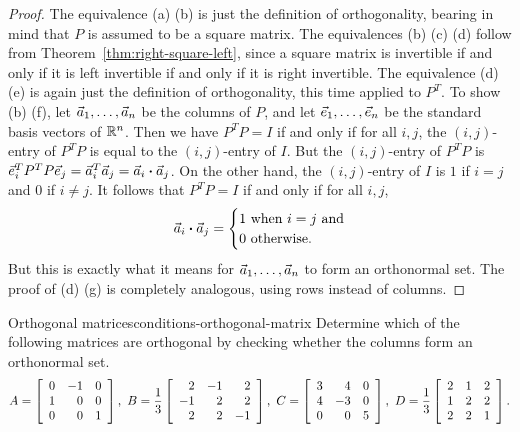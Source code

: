 \documentclass{ximera}
\begin{document}
\begin{proof}
  The equivalence (a) {\textiff} (b) is just the definition of
  orthogonality, bearing in mind that $P$ is assumed to be a square
  matrix. The equivalences (b) {\textiff} (c) {\textiff} (d) follow
  from Theorem~\ref{thm:right-square-left}, since a square matrix is
  invertible if and only if it is left invertible if and only if it is
  right invertible.  The equivalence (d) {\textiff} (e) is again just
  the definition of orthogonality, this time applied to $P^T$. To show
  (b) {\textiff} (f), let $\vect{a}_1,\ldots,\vect{a}_n$ be the
  columns of $P$, and let $\vect{e}_1,\ldots,\vect{e}_n$ be the
  standard basis vectors of $\R^n$. Then we have $P^TP = I$ if and
  only if for all $i,j$, the $(i,j)$-entry of $P^TP$ is equal to the
  $(i,j)$-entry of $I$.  But the $(i,j)$-entry of $P^TP$ is
  $\vect{e}_i^TP^TP\vect{e}_j = \vect{a}_i^T\vect{a}_j =
  \vect{a}_i\dotprod\vect{a}_j$. On the other hand, the $(i,j)$-entry
  of $I$ is $1$ if $i=j$ and $0$ if $i\neq j$. It follows that
  $P^TP=I$ if and only if for all $i,j$,
  \begin{equation*}
    \vect{a}_i\dotprod\vect{a}_j=\begin{cases}
      1 & \mbox{when $i=j$ and} \\
      0 & \mbox{otherwise}.
    \end{cases}
  \end{equation*}
  But this is exactly what it means for $\vect{a}_1,\ldots,\vect{a}_n$
  to form an orthonormal set.
  The proof of (d) {\textiff} (g) is completely analogous, using rows
  instead of columns.
\end{proof}

\begin{example}{Orthogonal matrices}{conditions-orthogonal-matrix}
  Determine which of the following matrices are orthogonal by checking
  whether the columns form an orthonormal set.
  \begin{equation*}
    A = \startmat{rrr}
      0 & -1 & 0 \\
      1 & 0 & 0 \\
      0 & 0 & 1 \\
    \stopmat,
    \quad
    B = \frac{1}{3}
    \startmat{rrr}
      2  & -1 &  2 \\
      -1 &  2 &  2 \\
      2  &  2 & -1 \\
    \stopmat,
    \quad
    C =
    \startmat{rrr}
      3 &  4 & 0 \\
      4 & -3 & 0 \\
      0 &  0 & 5 \\
    \stopmat,
    \quad
    D = \frac{1}{3}
    \startmat{rrr}
      2  &  1 &  2 \\
      1  &  2 &  2 \\
      2  &  2 &  1 \\
    \stopmat.
  \end{equation*}
\end{example}
\end{document}
